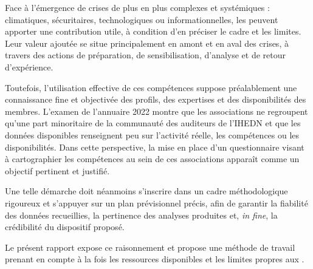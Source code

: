 Face à l'émergence de crises de plus en plus complexes et systémiques : climatiques, sécuritaires, technologiques ou informationnelles, les \AssociationsUnionIHEDN{} peuvent apporter une contribution utile, à condition d'en préciser le cadre et les limites. Leur valeur ajoutée se situe principalement en amont et en aval des crises, à travers des actions de préparation, de sensibilisation, d'analyse et de retour d'expérience.

Toutefois, l'utilisation effective de ces compétences suppose préalablement une connaissance fine et objectivée des profils, des expertises et des disponibilités des membres. L'examen de l'annuaire 2022 montre que les associations ne regroupent qu'une part minoritaire de la communauté des auditeurs de l'IHEDN et que les données disponibles renseignent peu sur l'activité réelle, les compétences ou les disponibilités. Dans cette perspective, la mise en place d'un questionnaire visant à cartographier les compétences au sein de ces associations apparaît comme un objectif pertinent et justifié.

Une telle démarche doit néanmoins s'inscrire dans un cadre méthodologique rigoureux et s'appuyer sur un plan prévisionnel précis, afin de garantir la fiabilité des données recueillies, la pertinence des analyses produites et, \textit{in fine}, la crédibilité du dispositif proposé.

Le présent rapport expose ce raisonnement et propose une méthode de travail prenant en compte à la fois les ressources disponibles et les limites propres aux \AssociationsUnionIHEDN.